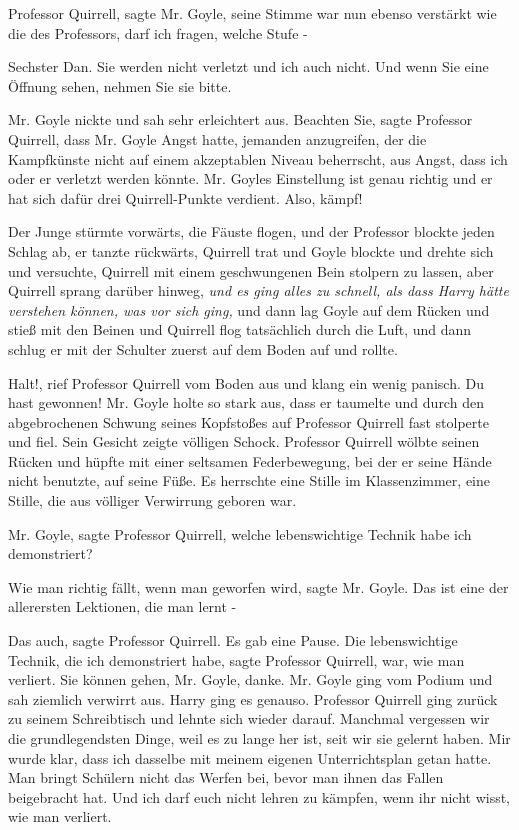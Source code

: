 \glqq{}Professor Quirrell\grqq{}, sagte Mr. Goyle, seine Stimme war nun ebenso
verstärkt wie die des Professors, \glqq{}darf ich fragen, welche Stufe -\grqq{}

\glqq{}Sechster Dan. Sie werden nicht verletzt und ich auch nicht. Und wenn Sie
eine Öffnung sehen, nehmen Sie sie bitte.\grqq{}

Mr. Goyle nickte und sah sehr erleichtert aus. \glqq{}Beachten Sie\grqq{}, sagte
Professor Quirrell, \glqq{}dass Mr. Goyle Angst hatte, jemanden anzugreifen, der
die Kampfkünste nicht auf einem akzeptablen Niveau beherrscht, aus Angst, dass
ich oder er verletzt werden könnte. Mr. Goyles Einstellung ist genau richtig und
er hat sich dafür drei Quirrell-Punkte verdient. Also, kämpf!\grqq{}

Der Junge stürmte vorwärts, die Fäuste flogen, und der Professor blockte jeden
Schlag ab, er tanzte rückwärts, Quirrell trat und Goyle blockte und drehte sich
und versuchte, Quirrell mit einem geschwungenen Bein stolpern zu lassen, aber
Quirrell sprang darüber hinweg, \emph{und es ging alles zu schnell, als dass
Harry hätte verstehen können, was vor sich ging,} und dann lag Goyle auf dem
Rücken und stieß mit den Beinen und Quirrell flog tatsächlich durch die Luft,
und dann schlug er mit der Schulter zuerst auf dem Boden auf und rollte.

\glqq{}Halt!\grqq{}, rief Professor Quirrell vom Boden aus und klang ein wenig
panisch. \glqq{}Du hast gewonnen!\grqq{} Mr. Goyle holte so stark aus, dass er
taumelte und durch den abgebrochenen Schwung seines Kopfstoßes auf Professor
Quirrell fast stolperte und fiel. Sein Gesicht zeigte völligen Schock. Professor
Quirrell wölbte seinen Rücken und hüpfte mit einer seltsamen Federbewegung, bei
der er seine Hände nicht benutzte, auf seine Füße. Es herrschte eine Stille im
Klassenzimmer, eine Stille, die aus völliger Verwirrung geboren war.

\glqq{}Mr. Goyle\grqq{}, sagte Professor Quirrell, \glqq{}welche lebenswichtige
Technik habe ich demonstriert?\grqq{}

\glqq{}Wie man richtig fällt, wenn man geworfen wird\grqq{}, sagte Mr. Goyle.
\glqq{}Das ist eine der allerersten Lektionen, die man lernt -\grqq{}

\glqq{}Das auch\grqq{}, sagte Professor Quirrell. Es gab eine Pause. \glqq{}Die
lebenswichtige Technik, die ich demonstriert habe\grqq{}, sagte Professor
Quirrell, \glqq{}war, wie man verliert. Sie können gehen, Mr. Goyle,
danke.\grqq{} Mr. Goyle ging vom Podium und sah ziemlich verwirrt aus. Harry
ging es genauso. Professor Quirrell ging zurück zu seinem Schreibtisch und
lehnte sich wieder darauf. \glqq{}Manchmal vergessen wir die grundlegendsten
Dinge, weil es zu lange her ist, seit wir sie gelernt haben. Mir wurde klar,
dass ich dasselbe mit meinem eigenen Unterrichtsplan getan hatte. Man bringt
Schülern nicht das Werfen bei, bevor man ihnen das Fallen beigebracht hat. Und
ich darf euch nicht lehren zu kämpfen, wenn ihr nicht wisst, wie man
verliert.\grqq{}

